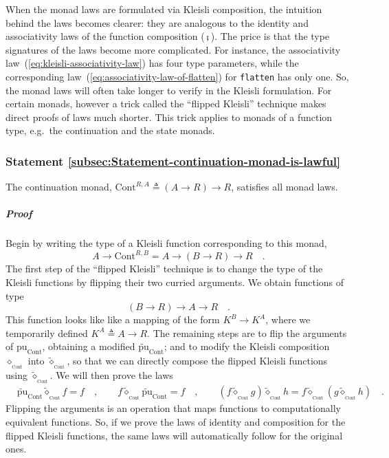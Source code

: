 When the monad laws are formulated via Kleisli composition, the intuition
behind the laws becomes clearer: they are analogous to the identity
and associativity laws of the function composition ($\bef$). The
price is that the type signatures of the laws become more complicated.
For instance, the associativity law~(\ref{eq:kleisli-associativity-law})
has four type parameters, while the corresponding law~(\ref{eq:associativity-law-of-flatten})
for \lstinline!flatten! has only one. So, the monad laws will often
take longer to verify in the Kleisli formulation. For certain monads,
however a trick called the \textsf{``}flipped
Kleisli\textsf{''} technique makes direct proofs of laws much shorter. This
trick applies to monads of a function type, e.g.~the continuation
and the state monads.

\subsubsection{Statement \label{subsec:Statement-continuation-monad-is-lawful}\ref{subsec:Statement-continuation-monad-is-lawful}}

The continuation monad, $\text{Cont}^{R,A}\triangleq\left(A\rightarrow R\right)\rightarrow R$,
satisfies all monad laws.

\subparagraph{Proof}

Begin by writing the type of a Kleisli function corresponding to this
monad,
\[
A\rightarrow\text{Cont}^{R,B}=A\rightarrow\left(B\rightarrow R\right)\rightarrow R\quad.
\]
The first step of the \textsf{``}flipped Kleisli\textsf{''} technique is to change
the type of the Kleisli functions by flipping their two curried arguments.
We obtain functions of type
\[
\left(B\rightarrow R\right)\rightarrow A\rightarrow R\quad.
\]
This function looks like like a mapping of the form $K^{B}\rightarrow K^{A}$,
where we temporarily defined $K^{A}\triangleq A\rightarrow R$. The
remaining steps are to flip the arguments of $\text{pu}_{\text{Cont}}$,
obtaining a modified $\tilde{\text{pu}}_{\text{Cont}}$; and to modify
the Kleisli composition $\diamond_{_{\text{Cont}}}$ into $\tilde{\diamond}_{_{\text{Cont}}}$,
so that we can directly compose the flipped Kleisli functions using
$\tilde{\diamond}_{_{\text{Cont}}}$. We will then prove the laws
\begin{align*}
 & \tilde{\text{pu}}_{\text{Cont}}\tilde{\diamond}_{_{\text{Cont}}}f=f\quad,\quad\quad f\tilde{\diamond}_{_{\text{Cont}}}\tilde{\text{pu}}_{\text{Cont}}=f\quad,\quad\quad(f\tilde{\diamond}_{_{\text{Cont}}}g)\tilde{\diamond}_{_{\text{Cont}}}h=f\tilde{\diamond}_{_{\text{Cont}}}(g\tilde{\diamond}_{_{\text{Cont}}}h)\quad.
\end{align*}
Flipping the arguments is an operation that maps functions to computationally
equivalent functions. So, if we prove the laws of identity and composition
for the flipped Kleisli functions, the same laws will automatically
follow for the original ones.

